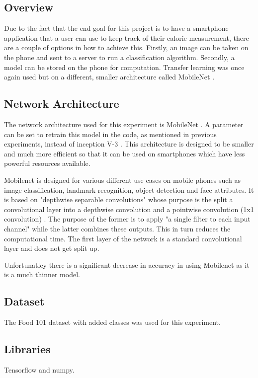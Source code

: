\subsection*{Overview}
Due to the fact that the end goal for this project is to have a smartphone
application that a user can use to keep track of their calorie measurement,
there are a couple of options in how to achieve this. Firstly, an image can be
taken on the phone and sent to a server to run a classification algorithm.
Secondly, a model can be stored on the phone for computation. Transfer learning was once again used but on a different, smaller architecture called MobileNet \textcite{mobilenet}.

\subsection*{Network Architecture}
The network architecture used for this experiment is MobileNet \textcite{mobilenet}.
A parameter can be set to retrain this model in the code, as mentioned in previous experiments, instead of inception V-3 \textcite{retrainInception}. 
This architecture is designed to be smaller and much more efficient so that
it can be used on smartphones which have less powerful resources available.

Mobilenet is designed for various different use cases on mobile phones such as image classification, landmark recognition, object detection and face attributes.
It is based on "depthwise separable convolutions" whose purpose is the split a convolutional layer into a depthwise convolution and a pointwise convolution (1x1 convolution) \textcite{mobilenet}.
The purpose of the former is to apply "a single filter to each input channel" \textcite{mobilenet} while the latter combines these outputs.
This in turn reduces the computational time.
The first layer of the network is a standard convolutional layer and does not get split up.

Unfortunatley there is a significant decrease in accuracy in using Mobilenet as it is a much thinner model.

\subsection*{Dataset}
The Food 101 dataset \textcite{food101} with added classes was used for this experiment.

\subsection*{Libraries}
Tensorflow and numpy.

